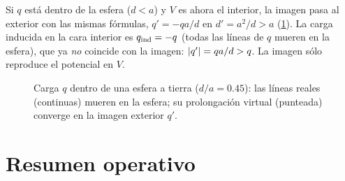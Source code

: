 \documentclass[11pt,a4paper,twoside]{article}
\begin{document}
\begin{observacion}
Si $q$ está dentro de la esfera ($d<a$) y $V$ es ahora el interior, la imagen pasa al
exterior con las mismas fórmulas, $q'=-qa/d$ en $d'=a^{2}/d>a$ (\cref{fig:esfera-interior}).
La carga inducida en la cara interior es $q_{\mathrm{ind}}=-q$ (todas las líneas de $q$ mueren en la
esfera), que ya \emph{no} coincide con la imagen: $\left\lvert q'\right\rvert=qa/d>q$. La imagen sólo reproduce el
potencial en $V$.
\end{observacion}

\begin{figure}[!htb]
  \centering
  
  \caption{Carga $q$ dentro de una esfera a tierra ($d/a=0.45$): las líneas reales
  (continuas) mueren en la esfera; su prolongación virtual (punteada) converge en la imagen
  exterior $q'$.}
  \label{fig:esfera-interior}
\end{figure}

\section{Resumen operativo}
\end{document}
